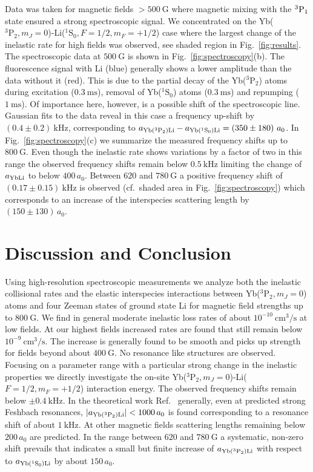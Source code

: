 \documentclass[twocolumn,superscriptaddress,showpacs,floatfix,amsmath,amssymb]{revtex4-1}
\newcommand{\singlet}{{}^1\mathrm{S}_0}
\newcommand{\triplet}{{}^3\mathrm{P}_2}
\newcommand{\cm}{\mathrm{cm}}
\newcommand{\msec}{\mathrm{ms}}
\newcommand{\s}{\mathrm{s}}
\newcommand{\G}{\mathrm{G}}
\newcommand{\kHz}{\mathrm{kHz}}
\begin{document}
Data was taken for magnetic fields $> 500~\G$ where magnetic mixing with the
$^3{\rm P}_{1}$ state ensured a strong spectroscopic signal. We concentrated
on the Yb($\triplet, m_J = 0$)-Li($\singlet, F=1/2, m_F=+1/2$) case where the
largest change of the inelastic rate for high fields was observed, see shaded
region in Fig.~\ref{fig:results}. The spectroscopic data at $500~\G$ is shown
in Fig.~\ref{fig:spectroscopy}(b). The fluorescence signal with Li (blue)
generally shows a lower amplitude than the data without it (red). This is due
to the partial decay of the Yb($\triplet$) atoms during excitation
($0.3~\msec$), removal of Yb($\singlet$) atoms ($0.3~\msec$) and repumping
($1~\msec$). Of importance here, however, is a possible shift of the
spectroscopic line. Gaussian fits to the data reveal in this case a frequency
up-shift by $(0.4 \pm 0.2)~\kHz$, corresponding to $a_{{\rm Yb}(\triplet){\rm
Li}} - a_{{\rm Yb}(\singlet){\rm Li}} = (350 \pm 180)~a_0$. In
Fig.~\ref{fig:spectroscopy}(c) we summarize the measured frequency shifts up
to $800~\G$. Even though the inelastic rate shows variations by a factor of
two in this range the observed frequency shifts remain below $0.5~\kHz$
limiting the change of $a_{\rm YbLi}$ to below $400\,a_0$. Between $620$ and
$780~\G$ a positive frequency shift of $(0.17 \pm 0.15)~\kHz$ is observed
(cf.\ shaded area in Fig.~\ref{fig:spectroscopy}) which corresponds to an
increase of the interspecies scattering length by $(150 \pm 130)\,a_0$.

\section{Discussion and Conclusion}
\label{sec:discussion}

Using high-resolution spectroscopic measurements we analyze both the inelastic
collisional rates and the elastic interspecies interactions between
Yb($\triplet, m_J = 0$) atoms and four Zeeman states of ground state Li for
magnetic field strengths up to $800~\G$. We find in general moderate inelastic
loss rates of about $10^{-10}~\cm^3/\s$ at low fields. At our highest fields
increased rates are found that still remain below $10^{-9}~\cm^3/\s$. The
increase is generally found to be smooth and picks up strength for fields
beyond about $400~\G$. No resonance like structures are observed. Focusing on
a parameter range with a particular strong change in the inelastic properties
we directly investigate the on-site Yb($\triplet, m_J=0$)-Li($F=1/2,
m_F=+1/2$) interaction energy. The observed frequency shifts remain below $\pm
0.4~\kHz$. In the theoretical work
Ref.~\cite{gonzalez-martinez_magnetically_2013} generally, even at predicted
strong Feshbach resonances, $|a_{{\rm Yb}(\triplet){\rm Li}}| < 1000\,a_0$ is
found corresponding to a resonance shift of about $1~\kHz$. At other magnetic
fields scattering lengths remaining below $200\,a_0$ are predicted. In the
range between $620$ and $780~\G$ a systematic, non-zero shift prevails that
indicates a small but finite increase of $a_{{\rm Yb}(\triplet){\rm Li}}$ with
respect to $a_{{\rm Yb}(\singlet){\rm Li}}$ by about $150\,a_0$.
\end{document}

